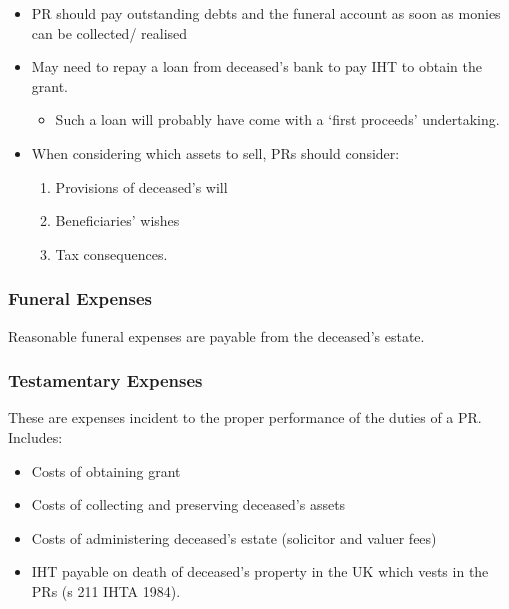 \documentclass[
]{article}
\providecommand{\tightlist}{%
  \setlength{\itemsep}{0pt}\setlength{\parskip}{0pt}}
\begin{document}
\begin{itemize}
\tightlist
\item
  PR should pay outstanding debts and the funeral account as soon as
  monies can be collected/ realised
\item
  May need to repay a loan from deceased's bank to pay IHT to obtain the
  grant.

  \begin{itemize}
  \tightlist
  \item
    Such a loan will probably have come with a `first proceeds'
    undertaking.
  \end{itemize}
\item
  When considering which assets to sell, PRs should consider:

  \begin{enumerate}
  \def\labelenumi{\arabic{enumi}.}
  \tightlist
  \item
    Provisions of deceased's will
  \item
    Beneficiaries' wishes
  \item
    Tax consequences.
  \end{enumerate}
\end{itemize}

\hypertarget{funeral-expenses}{%
\subsubsection{Funeral Expenses}\label{funeral-expenses}}

Reasonable funeral expenses are payable from the deceased's estate.

\hypertarget{testamentary-expenses}{%
\subsubsection{Testamentary Expenses}\label{testamentary-expenses}}

These are expenses incident to the proper performance of the duties of a
PR. Includes:

\begin{itemize}
\tightlist
\item
  Costs of obtaining grant
\item
  Costs of collecting and preserving deceased's assets
\item
  Costs of administering deceased's estate (solicitor and valuer fees)
\item
  IHT payable on death of deceased's property in the UK which vests in
  the PRs (s 211 IHTA 1984).
\end{itemize}
\end{document}
